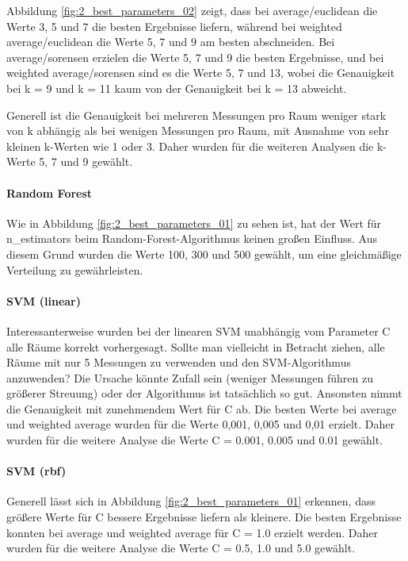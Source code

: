 Abbildung \ref{fig:2_best_parameters_02} zeigt, dass bei average/euclidean die Werte 3, 5 und 7 die besten Ergebnisse liefern, während bei weighted average/euclidean die Werte 5, 7 und 9 am besten abschneiden. Bei average/sorensen erzielen die Werte 5, 7 und 9 die besten Ergebnisse, und bei weighted average/sorensen sind es die Werte 5, 7 und 13, wobei die Genauigkeit bei k = 9 und k = 11 kaum von der Genauigkeit bei k = 13 abweicht.

Generell ist die Genauigkeit bei mehreren Messungen pro Raum weniger stark von k abhängig als bei wenigen Messungen pro Raum, mit Ausnahme von sehr kleinen k-Werten wie 1 oder 3. Daher wurden für die weiteren Analysen die k-Werte 5, 7 und 9 gewählt.

\paragraph{Random Forest}

Wie in Abbildung \ref{fig:2_best_parameters_01} zu sehen ist, hat der Wert für n\_estimators beim Random-Forest-Algorithmus keinen großen Einfluss. Aus diesem Grund wurden die Werte 100, 300 und 500 gewählt, um eine gleichmäßige Verteilung zu gewährleisten.

\paragraph{SVM (linear)}


Interessanterweise wurden bei der linearen SVM unabhängig vom Parameter C alle Räume korrekt vorhergesagt. Sollte man vielleicht in Betracht ziehen, alle Räume mit nur 5 Messungen zu verwenden und den SVM-Algorithmus anzuwenden? Die Ursache könnte Zufall sein (weniger Messungen führen zu größerer Streuung) oder der Algorithmus ist tatsächlich so gut. Ansonsten nimmt die Genauigkeit mit zunehmendem Wert für C ab. Die besten Werte bei average und weighted average wurden für die Werte 0,001, 0,005 und 0,01 erzielt. Daher wurden für die weitere Analyse die Werte C = 0.001, 0.005 und 0.01 gewählt.

\paragraph{SVM (rbf)}

Generell lässt sich in Abbildung \ref{fig:2_best_parameters_01} erkennen, dass größere Werte für C bessere Ergebnisse liefern als kleinere. Die besten Ergebnisse konnten bei average und weighted average für C = 1.0 erzielt werden. Daher wurden für die weitere Analyse die Werte C = 0.5, 1.0 und 5.0 gewählt.


